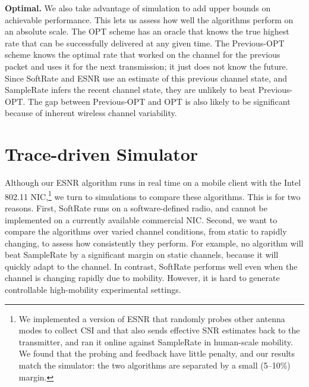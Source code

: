\textbf{Optimal.} We also take advantage of simulation to add upper bounds on achievable performance. This lets us assess how well the algorithms perform on an absolute scale. The OPT scheme has an oracle that knows the true highest rate that can be successfully delivered at any given time. The Previous-OPT scheme knows the optimal rate that worked on the channel for the previous packet and uses it for the next transmission; it just does not know the future. Since SoftRate and ESNR use an estimate of this previous channel state, and SampleRate infers the recent channel state, they are unlikely to beat Previous-OPT\@. The gap between Previous-OPT and OPT is also likely to be significant because of inherent wireless channel variability.


\section{Trace-driven Simulator}


Although our ESNR algorithm runs in real time on a mobile client with the Intel 802.11 NIC,\footnote{We implemented a version of ESNR that randomly probes other antenna modes to collect CSI and that also sends effective SNR estimates back to the transmitter, and ran it online against SampleRate in human-scale mobility. We found that the probing and feedback have little penalty, and our results match the simulator: the two algorithms are separated by a small (5--10\%) margin.} we turn to simulations to compare these algorithms. %
This is for two reasons. First, SoftRate runs on a software-defined radio, and cannot be implemented on a currently available commercial NIC\@. Second, we want to compare the algorithms over varied channel conditions, from static to rapidly changing, to assess how consistently they perform. 
For example, no algorithm will beat SampleRate by a significant margin on static channels, because it will quickly adapt to the channel. In contrast, SoftRate performs well even when the channel is changing rapidly due to mobility. However, it is hard to generate controllable high-mobility experimental settings. 


